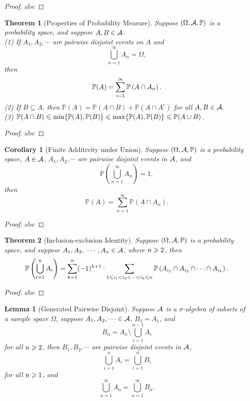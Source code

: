 \documentclass[openany,12pt]{book}
\newtheorem{theorem}{Theorem}[chapter]
\newtheorem{corollary}{Corollary}[chapter]
\newtheorem{lemma}{Lemma}[chapter]
\begin{document}
\begin{proof}
  abc
\end{proof}

\begin{theorem}[Properties of Probability Measure]
Suppose $(\Omega,\mathcal{A},\mathbb{P})$ is a probability space, and suppose $A,B\in\mathcal{A}$.
\\
(1) If $A_1,A_2,\cdots$ are pairwise disjoint events on $A$ and 
$$ \bigcup_{n=1}^\infty A_n =\Omega,$$ then 
$$\mathbb{P}(A)= \sum_{i=1}^{\infty} \mathbb{P}\left(A \cap A_n \right).$$
(2) If $B\subseteq A$, then $\mathbb{P}(A)=\mathbb{P}(A\cap B)+\mathbb{P}(A\cap A^c )$ for all $A,B\in\mathcal{A}$.\\
(3) $\mathbb{P}(A\cap B)  \leqslant \min \{\mathbb{P}(A),\mathbb{P}(B)\}  \leqslant \max\{ \mathbb{P}(A),\mathbb{P}(B)\} \leqslant  \mathbb{P}(A\cup B)$.
\end{theorem}

\begin{proof}
  abc
\end{proof}

\begin{corollary}[Finite Additivity under Union]
Suppose $(\Omega,\mathcal{A},\mathbb{P})$ is a probability space, $A\in\mathcal{A}$, $A_1,A_2,\cdots$ are pairwise disjoint events in $\mathcal{A}$, and $$\mathbb{P}\left(\bigcup_{n=1}^\infty A_n \right)=1,$$ then 
$$\mathbb{P}(A)=\sum_{n=1}^\infty \mathbb{P}\left(A\cap A_n \right).$$ 
\end{corollary}

\begin{proof}
  abc
\end{proof}

\begin{theorem}[Inclusion-exclusion Identity]
Suppose $(\Omega,\mathcal{A},\mathbb{P})$ is a probability space, and suppose $A_1,A_2,\ \cdots,A_n\in\ma $, where $n \geqslant2$, then $$\mathbb{P}\left(\bigcup_{i=1}^n A_i \right)=\sum_{k=1}^n(-1)^{k+1}\cdot  \sum_{1\leqslant i_1<i_2<\cdots<i_k\leqslant n}\mathbb{P}\left(A_{i_1} \cap A_{i_2 } \cap\cdots\cap A_{i_k } \right).$$
\end{theorem}

\begin{proof}
  abc
\end{proof}

\begin{lemma}[Generated Pairwise Disjoint]
Suppose $\mathcal{A}$ is a $\sigma$-algebra of subsets of a sample space $\Omega$, suppose $A_1,A_2,\cdots\in\mathcal{A}$, $B_1=A_1$, and $$B_n=A_n\setminus\bigcup_{i=1}^{n-1}A_i$$  for all $n\geqslant2$, then $B_1,B_2,\cdots$ are pairwise disjoint events in $\mathcal{A}$, $$\bigcup_{i=1}^nA_i =\bigcup_{i=1}^nB_i$$  for all $n\geqslant1$, and $$\bigcup_{n=1}^\infty A_n =\bigcup_{n=1}^\infty B_n.$$
\end{lemma}
\end{document}
